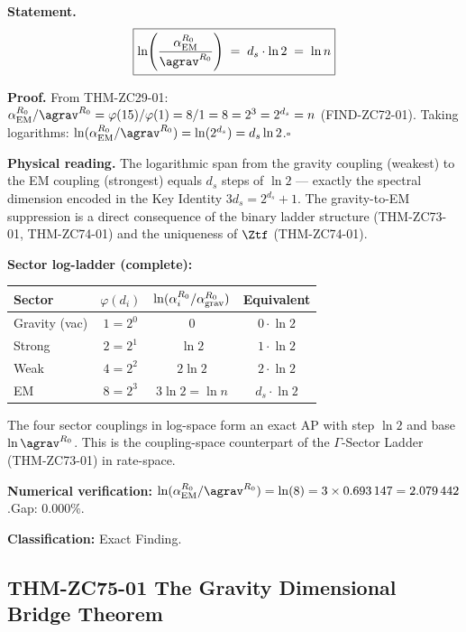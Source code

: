 \documentclass[12pt, a4paper]{article}
\renewcommand{\aEM}{\alpha_{\rm EM}}
\begin{document}
\begin{derivedbox}[title={FIND-ZC75-02: Log-Separation Identity
  ($R_0$, Exact)}]

\textbf{Statement.}
\[
  \boxed{\ln\!\left(\frac{\aEM^{R_0}}{\agrav^{R_0}}\right)
  \;=\; d_s \cdot \ln 2 \;=\; \ln n}
\]

\textbf{Proof.}
From THM-ZC29-01: $\aEM^{R_0}/\agrav^{R_0} = \varphi(15)/\varphi(1)
= 8/1 = 8 = 2^3 = 2^{d_s} = n$ (FIND-ZC72-01).
Taking logarithms: $\ln(\aEM^{R_0}/\agrav^{R_0}) = \ln(2^{d_s})
= d_s \ln 2$.\hfill$\square$

\textbf{Physical reading.}
The logarithmic span from the gravity coupling (weakest) to the
EM coupling (strongest) equals $d_s$ steps of $\ln 2$ --- exactly
the spectral dimension encoded in the Key Identity $3d_s = 2^{d_s}+1$.
The gravity-to-EM suppression is a direct consequence of the
binary ladder structure (THM-ZC73-01, THM-ZC74-01) and the
uniqueness of $\Ztf$ (THM-ZC74-01).

\textbf{Sector log-ladder (complete):}
\medskip
\begin{center}
{\small\renewcommand{\arraystretch}{1.25}
\begin{tabular}{@{}lccc@{}}
\toprule
Sector & $\varphi(d_i)$ & $\ln(\alpha_i^{R_0}/\alpha_{\rm grav}^{R_0})$
  & Equivalent \\
\midrule
Gravity (vac) & $1 = 2^0$ & $0$          & $0 \cdot \ln2$ \\
Strong        & $2 = 2^1$ & $\ln 2$      & $1 \cdot \ln2$ \\
Weak          & $4 = 2^2$ & $2\ln 2$     & $2 \cdot \ln2$ \\
EM            & $8 = 2^3$ & $3\ln 2 = \ln n$ & $d_s \cdot \ln2$ \\
\bottomrule
\end{tabular}}
\end{center}
\medskip

The four sector couplings in log-space form an exact AP
with step $\ln 2$ and base $\ln\agrav^{R_0}$.
This is the coupling-space counterpart of the $\Gamma$-Sector
Ladder (THM-ZC73-01) in rate-space.

\textbf{Numerical verification:}
$\ln(\aEM^{R_0}/\agrav^{R_0}) = \ln(8) = 3 \times 0.693\,147
= 2.079\,442$.\quad Gap: $0.000\%$.

\textbf{Classification:} Exact Finding.
\end{derivedbox}

\subsection{THM-ZC75-01 \quad The Gravity Dimensional Bridge Theorem}
\label{sec:thm01}
\end{document}
